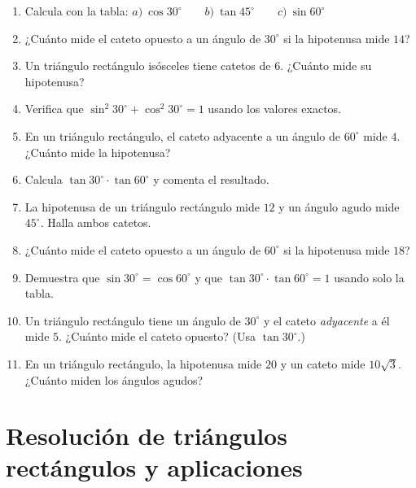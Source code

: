 \documentclass[12pt, letterpaper]{article}
\providecommand{\sen}{\sin}
\begin{document}
\begin{enumerate}[leftmargin=*, resume]
  \item \facil{} Calcula con la tabla: $a)\ \cos 30^{\circ} \qquad b)\ \tan 45^{\circ} \qquad c)\ \sen 60^{\circ}$

  \item \facil{} ¿Cuánto mide el cateto opuesto a un ángulo de $30^{\circ}$ si la hipotenusa mide $14$?

  \item \facil{} Un triángulo rectángulo isósceles tiene catetos de $6$. ¿Cuánto mide su hipotenusa?

  \item \facil{} Verifica que $\sen^2 30^{\circ} + \cos^2 30^{\circ} = 1$ usando los valores exactos.

  \item \medio{} En un triángulo rectángulo, el cateto adyacente a un ángulo de $60^{\circ}$ mide $4$. ¿Cuánto mide la hipotenusa?

  \item \medio{} Calcula $\tan 30^{\circ} \cdot \tan 60^{\circ}$ y comenta el resultado.

  \item \medio{} La hipotenusa de un triángulo rectángulo mide $12$ y un ángulo agudo mide $45^{\circ}$. Halla ambos catetos.

  \item \medio{} ¿Cuánto mide el cateto opuesto a un ángulo de $60^{\circ}$ si la hipotenusa mide $18$?

  \item \dificil{} Demuestra que $\sen 30^{\circ} = \cos 60^{\circ}$ y que $\tan 30^{\circ} \cdot \tan 60^{\circ} = 1$ usando solo la tabla.

  \item \dificil{} Un triángulo rectángulo tiene un ángulo de $30^{\circ}$ y el cateto \emph{adyacente} a él mide $5$. ¿Cuánto mide el cateto opuesto? (Usa $\tan 30^{\circ}$.)

  \item \dificil{} En un triángulo rectángulo, la hipotenusa mide $20$ y un cateto mide $10\sqrt{3}$. ¿Cuánto miden los ángulos agudos?
\end{enumerate}


\section{Resolución de triángulos rectángulos y aplicaciones}
\end{document}
